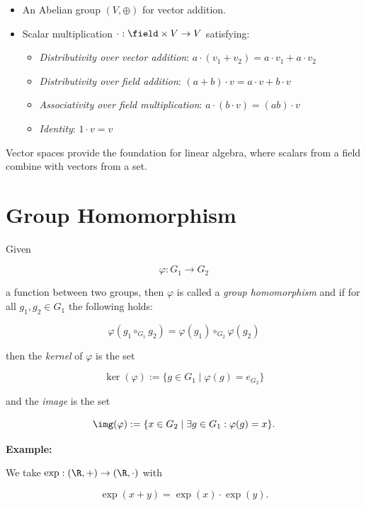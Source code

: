 \begin{itemize}

	\item An Abelian group \((V, \oplus)\) for vector addition.

	\item Scalar multiplication \(\cdot: \field \times V \to V\) satisfying:

	      \begin{itemize}

		      \item \emph{Distributivity over vector addition}: \(a \cdot (v_1 + v_2) = a \cdot v_1 + a \cdot v_2\)

		      \item \emph{Distributivity over field addition}: \((a + b) \cdot v = a \cdot v + b \cdot v\)

		      \item \emph{Associativity over field multiplication}: \(a \cdot (b \cdot v) = (ab) \cdot v\)

		      \item \emph{Identity}: \(1 \cdot v = v\)

	      \end{itemize}

\end{itemize}

Vector spaces provide the foundation for linear algebra, where scalars from a field combine with vectors from a set.

\section{Group Homomorphism}

Given

\[
	\varphi: G_1 \to G_2
\]

a function between two groups, then \(\varphi\) is called a \emph{group homomorphism} and if for all
\(g_1, g_2 \in G_1\) the following holds:

\[
	\varphi(g_1 \circ_{G_1} g_2) = \varphi(g_1) \circ_{G_2} \varphi (g_2)
\]

then the \emph{kernel} of \(\varphi\) is the set

\[
	\ker (\varphi) := \{g \in G_1 \mid \varphi(g) = e_{G_2}\}
\]

and the \emph{image} is the set

\[
	\img (\varphi) := \{x \in G_2 \mid \exists g \in G_1: \varphi(g) = x\}.
\]

\textbf{Example:}

We take \(\exp: (\R, +) \to (\R, \cdot)\) with

\[
	\exp(x + y) = \exp(x) \cdot \exp(y).
\]

